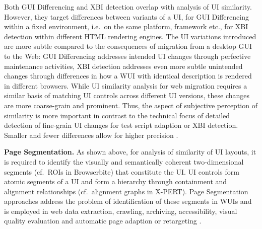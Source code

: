 Both GUI Differencing and XBI detection overlap with analysis of UI similarity.
However, they target differences between variants of a UI, for GUI Differencing within a fixed environment, i.e.~on the same platform, framework etc., for XBI detection within different HTML rendering engines.
The UI variations introduced are more subtle compared to the consequences of migration from a desktop GUI to the Web: GUI Differencing addresses intended UI changes through perfective maintenance activities, XBI detection addresses even more subtle unintended changes through differences in how a WUI with identical description is rendered in different browsers.
While UI similarity analysis for web migration requires a similar basis of matching UI controls across different UI versions, these changes are more coarse-grain and prominent.
Thus, the aspect of subjective perception of similarity is more important in contrast to the technical focus of detailed detection of fine-grain UI changes for test script adaption or XBI detection.
Smaller and fewer differences allow for higher precision \autocite{Grechanik2018}.

\textbf{Page Segmentation.} As shown above, for analysis of similarity of UI layouts, it is required to identify the visually and semantically coherent two-dimensional segments (cf.~ROIs in Browserbite) that constitute the UI.
UI controls form atomic segments of a UI and form a hierarchy through containment and alignment relationships (cf.~alignment graphs in X-PERT).
Page Segmentation approaches address the problem of identification of these segments in WUIs and is employed in web data extraction, crawling, archiving, accessibility, visual quality evaluation and automatic page adaption or retargeting \autocite{Sanoja2014,Talton2011Bricolage,Liu2010VIDE,Cai2003VIPS}.

